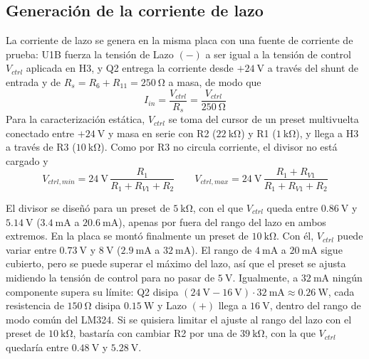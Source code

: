 \subsection{Generación de la corriente de lazo}
\label{subsec:campo-fuente-prueba}

La corriente de lazo se genera en la misma placa con una fuente de corriente de prueba: U1B fuerza la tensión de
Lazo $(-)$ a ser igual a la tensión de control $V_{ctrl}$ aplicada en H3, y Q2 entrega la corriente desde
$+\SI{24}{\volt}$ a través del shunt de entrada y de $R_s = R_6 + R_{11} = \SI{250}{\ohm}$ a masa, de modo que
\begin{equation}
  I_{in} = \frac{V_{ctrl}}{R_s} = \frac{V_{ctrl}}{\SI{250}{\ohm}}
  \label{eq:campo-iin}
\end{equation}
Para la caracterización estática, $V_{ctrl}$ se toma del cursor de un preset multivuelta conectado entre
$+\SI{24}{\volt}$ y masa en serie con R2 ($\SI{22}{\kilo\ohm}$) y R1 ($\SI{1}{\kilo\ohm}$), y llega a H3 a través
de R3 ($\SI{10}{\kilo\ohm}$). Como por R3 no circula corriente, el divisor no está cargado y
\begin{equation}
  V_{ctrl,min} = \SI{24}{\volt} \, \frac{R_1}{R_1 + R_{V1} + R_2} \qquad
  V_{ctrl,max} = \SI{24}{\volt} \, \frac{R_1 + R_{V1}}{R_1 + R_{V1} + R_2}
  \label{eq:campo-vctrl}
\end{equation}

El divisor se diseñó para un preset de $\SI{5}{\kilo\ohm}$, con el que $V_{ctrl}$ queda entre $\SI{0.86}{\volt}$ y
$\SI{5.14}{\volt}$ ($\SI{3.4}{\milli\ampere}$ a $\SI{20.6}{\milli\ampere}$), apenas por fuera del rango del lazo
en ambos extremos. En la placa se montó finalmente un preset de $\SI{10}{\kilo\ohm}$. Con él, $V_{ctrl}$ puede
variar entre $\SI{0.73}{\volt}$ y $\SI{8}{\volt}$ ($\SI{2.9}{\milli\ampere}$ a
$\SI{32}{\milli\ampere}$). El rango de $\SI{4}{\milli\ampere}$ a $\SI{20}{\milli\ampere}$ sigue cubierto, pero se
puede superar el máximo del lazo, así que el preset se ajusta midiendo la tensión de control para no pasar de
$\SI{5}{\volt}$.
Igualmente, a $\SI{32}{\milli\ampere}$ ningún componente supera su límite: Q2 disipa
$(\SI{24}{\volt} - \SI{16}{\volt}) \cdot \SI{32}{\milli\ampere} \approx \SI{0.26}{\watt}$, cada resistencia de
$\SI{150}{\ohm}$ disipa $\SI{0.15}{\watt}$ y Lazo $(+)$ llega a $\SI{16}{\volt}$, dentro del rango de modo común del
LM324. Si se quisiera limitar el ajuste al rango del lazo con el preset de $\SI{10}{\kilo\ohm}$, bastaría con
cambiar R2 por una de $\SI{39}{\kilo\ohm}$, con la que $V_{ctrl}$ quedaría entre $\SI{0.48}{\volt}$ y
$\SI{5.28}{\volt}$.

